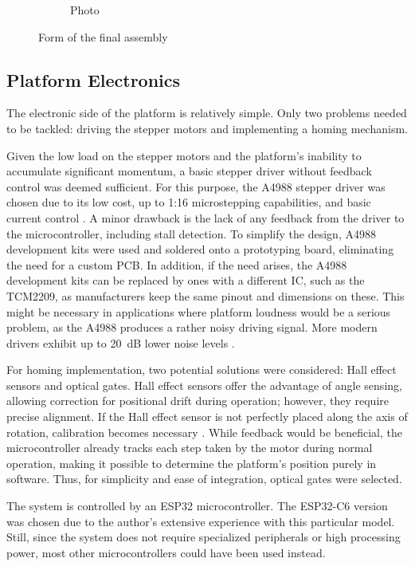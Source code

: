 \begin{figure}[h!]
\begin{subfigure}[b]{0.45\textwidth}
    \caption{Photo}
  \end{subfigure}
  \caption{Form of the final assembly}
  \label{fig:side_by_side}
\end{figure}


\subsection{Platform Electronics}

The electronic side of the platform is relatively simple.
Only two problems needed to be tackled: driving the stepper motors and implementing a homing mechanism.

Given the low load on the stepper motors and the platform's inability to accumulate significant momentum, a basic stepper driver without feedback control was deemed sufficient.
For this purpose, the A4988 stepper driver was chosen due to its low cost, up to 1:16 microstepping capabilities, and basic current control \cite{a4988}.
A minor drawback is the lack of any feedback from the driver to the microcontroller, including stall detection.
To simplify the design, A4988 development kits were used and soldered onto a prototyping board, eliminating the need for a custom PCB.
In addition, if the need arises, the A4988 development kits can be replaced by ones with a different IC, such as the TCM2209, as manufacturers keep the same pinout and dimensions on these.
This might be necessary in applications where platform loudness would be a serious problem, as the A4988 produces a rather noisy driving signal.
More modern drivers exhibit up to 20~dB lower noise levels \cite{a4988_sound}.

For homing implementation, two potential solutions were considered: Hall effect sensors and optical gates.
Hall effect sensors offer the advantage of angle sensing, allowing correction for positional drift during operation; however, they require precise alignment.
If the Hall effect sensor is not perfectly placed along the axis of rotation, calibration becomes necessary \cite{hall}.
While feedback would be beneficial, the microcontroller already tracks each step taken by the motor during normal operation, making it possible to determine the platform's position purely in software.
Thus, for simplicity and ease of integration, optical gates were selected.

The system is controlled by an ESP32 microcontroller.
The ESP32-C6 version was chosen due to the author's extensive experience with this particular model.
Still, since the system does not require specialized peripherals or high processing power, most other microcontrollers could have been used instead.

